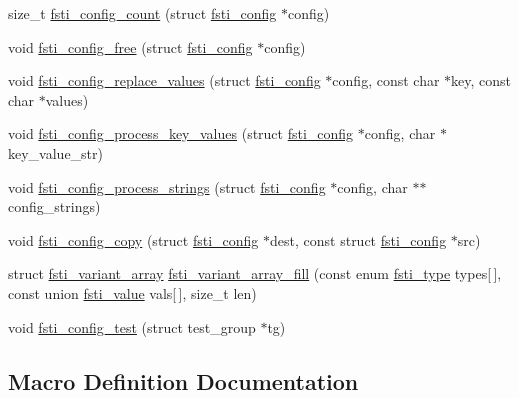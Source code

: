 \begin{DoxyCompactItemize}
size\+\_\+t \mbox{\hyperlink{fsti-config_8h_a508022bb109124636ed4c7e0002c2c08}{fsti\+\_\+config\+\_\+count}} (struct \mbox{\hyperlink{structfsti__config}{fsti\+\_\+config}} $\ast$config)
\item 
void \mbox{\hyperlink{fsti-config_8h_a89af0836846de6cf965e78643823705c}{fsti\+\_\+config\+\_\+free}} (struct \mbox{\hyperlink{structfsti__config}{fsti\+\_\+config}} $\ast$config)
\item 
void \mbox{\hyperlink{fsti-config_8h_ad11a9e59945cf4619a85164441ea5fd8}{fsti\+\_\+config\+\_\+replace\+\_\+values}} (struct \mbox{\hyperlink{structfsti__config}{fsti\+\_\+config}} $\ast$config, const char $\ast$key, const char $\ast$values)
\item 
void \mbox{\hyperlink{fsti-config_8h_a966baf752f37fcb8177ec0d42d9f103f}{fsti\+\_\+config\+\_\+process\+\_\+key\+\_\+values}} (struct \mbox{\hyperlink{structfsti__config}{fsti\+\_\+config}} $\ast$config, char $\ast$key\+\_\+value\+\_\+str)
\item 
void \mbox{\hyperlink{fsti-config_8h_ae86ff853ac86294d03a317636cdcbdaa}{fsti\+\_\+config\+\_\+process\+\_\+strings}} (struct \mbox{\hyperlink{structfsti__config}{fsti\+\_\+config}} $\ast$config, char $\ast$$\ast$config\+\_\+strings)
\item 
void \mbox{\hyperlink{fsti-config_8h_a634d47df34013cf7bba0c3dc67d8e45f}{fsti\+\_\+config\+\_\+copy}} (struct \mbox{\hyperlink{structfsti__config}{fsti\+\_\+config}} $\ast$dest, const struct \mbox{\hyperlink{structfsti__config}{fsti\+\_\+config}} $\ast$src)
\item 
struct \mbox{\hyperlink{structfsti__variant__array}{fsti\+\_\+variant\+\_\+array}} \mbox{\hyperlink{fsti-config_8h_a58182343b78c10550b55c54b4c61ea20}{fsti\+\_\+variant\+\_\+array\+\_\+fill}} (const enum \mbox{\hyperlink{fsti-defs_8h_ab12bd8dfbafbc55e2015aac7926007cf}{fsti\+\_\+type}} types\mbox{[}$\,$\mbox{]}, const union \mbox{\hyperlink{unionfsti__value}{fsti\+\_\+value}} vals\mbox{[}$\,$\mbox{]}, size\+\_\+t len)
\item 
void \mbox{\hyperlink{fsti-config_8h_a56851785b4dd54466e2d92ef3d55fc2f}{fsti\+\_\+config\+\_\+test}} (struct test\+\_\+group $\ast$tg)
\end{DoxyCompactItemize}


\subsection{Macro Definition Documentation}
\mbox{\label{fsti-config_8h_afa6ddaacee2774aa511014d325d62d84}} 
